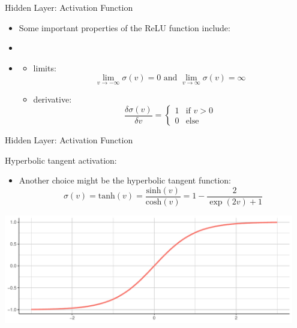 \documentclass[11pt,compress,t,notes=noshow]{beamer}
\newenvironment{knitrout}{}{} %
\newenvironment{blocki}[1]   %
{
 \begin{block}{#1}\begin{itemize}
}
{
\end{itemize}\end{block}
}
\begin{document}
\begin{frame} {Hidden Layer: Activation Function}
  \begin{itemize}
    \item Some important properties of the ReLU function include:
    \item[]
    \item[]
    \begin{itemize}
      \item limits: $$\lim_{v \to -\infty} \sigma(v) = 0 \text{ and } \lim_{v \to \infty} \sigma(v) = \infty$$
      \item derivative: 
      $$\frac{\delta\sigma(v)}{\delta v} =
        \begin{cases}
                                       1 & \text{if $v > 0$} \\
                                       0 & \text{else}
        \end{cases}
      $$
    \end{itemize}
  \end{itemize}
\end{frame}

\begin{frame} {Hidden Layer: Activation Function}
  \begin{blocki}{Hyperbolic tangent activation:}
    \item Another choice might be the hyperbolic tangent function:
    $$ \sigma (v) = \text{tanh}(v) = \frac{\text{sinh}(v)}{\text{cosh}(v)} = 1 - \frac{2}{\exp(2v) + 1}$$
  \end{blocki}
\begin{knitrout}\scriptsize
{}\color{fgcolor}

{\centering \includegraphics[width=0.95\textwidth]{figure/unnamed-chunk-3-1} 

}



\end{knitrout}
\end{frame}
\end{document}
